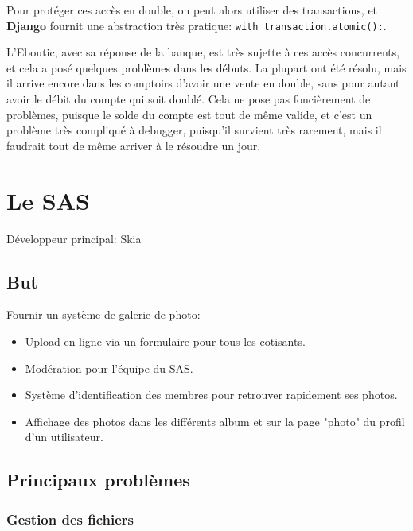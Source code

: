 \documentclass[a4paper]{report}
\begin{document}
\par Pour protéger ces accès en double, on peut alors utiliser des transactions, et \textbf{Django} fournit une
abstraction très pratique: \verb-with transaction.atomic():-.

\par L'Eboutic, avec sa réponse de la banque, est très sujette à ces accès concurrents, et cela a posé quelques
problèmes dans les débuts. La plupart ont été résolu, mais il arrive encore dans les comptoirs d'avoir une vente en
double, sans pour autant avoir le débit du compte qui soit doublé. Cela ne pose pas foncièrement de problèmes, puisque
le solde du compte est tout de même valide, et c'est un problème très compliqué à debugger, puisqu'il survient très
rarement, mais il faudrait tout de même arriver à le résoudre un jour.


\chapter{Le SAS}
\label{sec:le_sas}
\par Développeur principal: Skia

\section{But}
\label{sub:but}
\par Fournir un système de galerie de photo:
\begin{itemize}
    \item Upload en ligne via un formulaire pour tous les cotisants.
    \item Modération pour l'équipe du SAS.
    \item Système d'identification des membres pour retrouver rapidement ses photos.
    \item Affichage des photos dans les différents album et sur la page "photo" du profil d'un utilisateur.
\end{itemize}

\section{Principaux problèmes}
\label{sec:principaux_problemes}

\subsection{Gestion des fichiers}
\label{sub:gestion_des_fichiers}
\par
\end{document}
